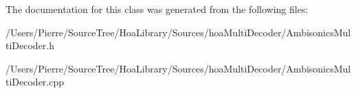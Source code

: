 The documentation for this class was generated from the following files\-:\begin{DoxyCompactItemize}
\item 
/\-Users/\-Pierre/\-Source\-Tree/\-Hoa\-Library/\-Sources/hoa\-Multi\-Decoder/Ambisonics\-Multi\-Decoder.\-h\item 
/\-Users/\-Pierre/\-Source\-Tree/\-Hoa\-Library/\-Sources/hoa\-Multi\-Decoder/Ambisonics\-Multi\-Decoder.\-cpp\end{DoxyCompactItemize}
